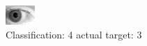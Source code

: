 \begin{figure}[h!]
\begin{center}
\includegraphics[width=0.60\columnwidth]{figures/ID240_class_4_target_3.png}
\end{center}
\caption{ Classification: 4 actual target: 3}
\label{fig:ID240_class_4_target_3}
\end{figure}
